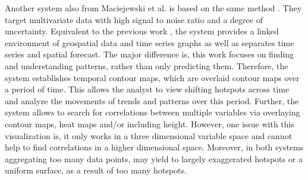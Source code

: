 \documentclass[electronic]{vgtc}             %
\begin{document}
Another system also from Maciejewski et al. \cite{maciejewski:2010} is based on the same method .
They target multivariate data with high signal to noise ratio and a degree of uncertainty.
Equivalent to the previous work \cite{maciejewski:2011}, the system provides a linked environment of geospatial data and time series graphs as well as separates time series and spatial forecast.
The major difference is, this work focuses on finding and understanding patterns, rather than only predicting them.
Therefore, the system establishes temporal contour maps, which are overlaid contour maps over a period of time. 
This allows the analyst to view shifting hotspots across time and analyze the movements of trends and patterns over this period.
Further, the system allows to search for correlations between multiple variables via overlaying contour maps, heat maps and/or including height. 
However, one issue with this visualization is, it only works in a three dimensional variable space and cannot help to find correlations in a higher dimensional space. 
Moreover, in both systems aggregating too many data points, may yield to largely exaggerated hotspots or a uniform surface, as a result of too many hotspots. 
\end{document}
